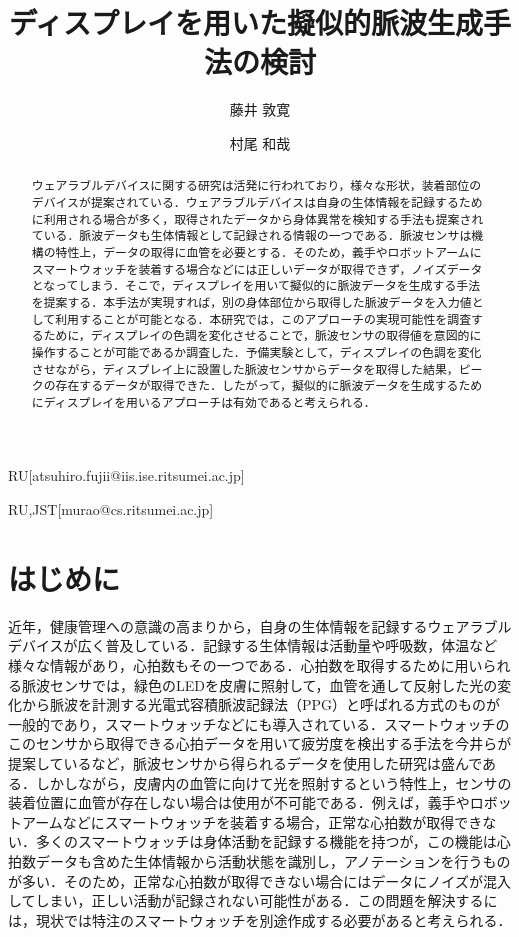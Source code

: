 \documentclass[submit,techrep]{ipsj}
\begin{document}
\title{ディスプレイを用いた擬似的脈波生成手法の検討}


\author{藤井 敦寛}{}{RU}[atsuhiro.fujii@iis.ise.ritsumei.ac.jp]
\author{村尾 和哉}{}{RU,JST}[murao@cs.ritsumei.ac.jp]

\begin{abstract}
	ウェアラブルデバイスに関する研究は活発に行われており，様々な形状，装着部位のデバイスが提案されている．ウェアラブルデバイスは自身の生体情報を記録するために利用される場合が多く，取得されたデータから身体異常を検知する手法も提案されている．脈波データも生体情報として記録される情報の一つである．脈波センサは機構の特性上，データの取得に血管を必要とする．そのため，義手やロボットアームにスマートウォッチを装着する場合などには正しいデータが取得できず，ノイズデータとなってしまう．そこで，ディスプレイを用いて擬似的に脈波データを生成する手法を提案する．本手法が実現すれば，別の身体部位から取得した脈波データを入力値として利用することが可能となる．本研究では，このアプローチの実現可能性を調査するために，ディスプレイの色調を変化させることで，脈波センサの取得値を意図的に操作することが可能であるか調査した．予備実験として，ディスプレイの色調を変化させながら，ディスプレイ上に設置した脈波センサからデータを取得した結果，ピークの存在するデータが取得できた．したがって，擬似的に脈波データを生成するためにディスプレイを用いるアプローチは有効であると考えられる．
\end{abstract}

\maketitle





\section{はじめに}
\label{introduction}
近年，健康管理への意識の高まりから，自身の生体情報を記録するウェアラブルデバイスが広く普及している．記録する生体情報は活動量や呼吸数，体温など様々な情報があり，心拍数もその一つである．心拍数を取得するために用いられる脈波センサでは，緑色のLEDを皮膚に照射して，血管を通して反射した光の変化から脈波を計測する光電式容積脈波記録法（PPG）と呼ばれる方式のものが一般的であり，スマートウォッチなどにも導入されている．スマートウォッチのこのセンサから取得できる心拍データを用いて疲労度を検出する手法を今井ら\cite{fatigue_detection}が提案しているなど，脈波センサから得られるデータを使用した研究は盛んである．しかしながら，皮膚内の血管に向けて光を照射するという特性上，センサの装着位置に血管が存在しない場合は使用が不可能である．例えば，義手やロボットアームなどにスマートウォッチを装着する場合，正常な心拍数が取得できない．多くのスマートウォッチは身体活動を記録する機能を持つが，この機能は心拍数データも含めた生体情報から活動状態を識別し，アノテーションを行うものが多い．そのため，正常な心拍数が取得できない場合にはデータにノイズが混入してしまい，正しい活動が記録されない可能性がある．この問題を解決するには，現状では特注のスマートウォッチを別途作成する必要があると考えられる．
\par
\end{document}
